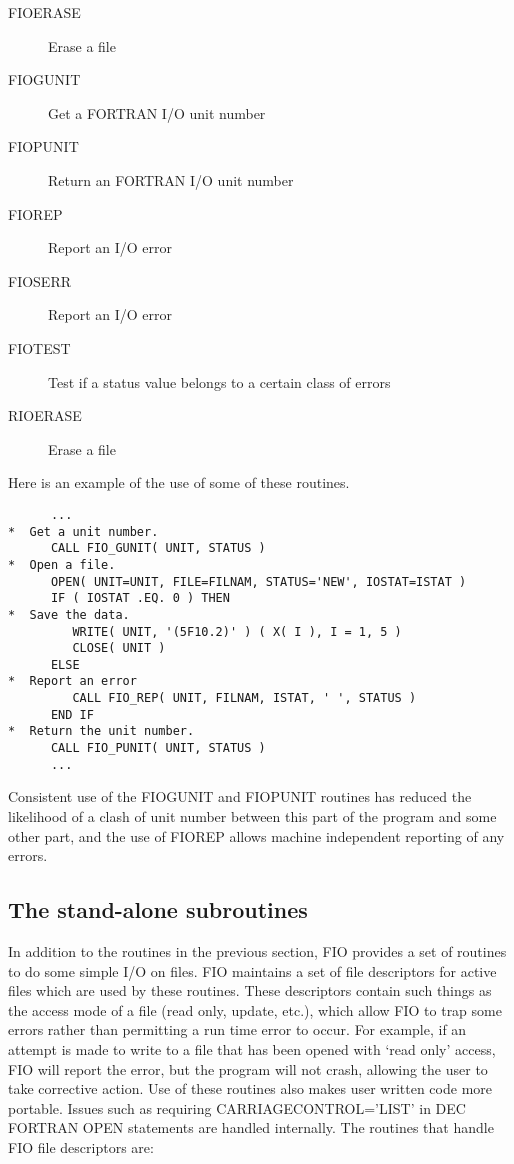 \documentclass[twoside,11pt]{article}
\renewcommand{\_}{\texttt{\symbol{95}}}
\begin{document}
\begin{description}
\item[FIO\_ERASE] Erase a file
\item[FIO\_GUNIT] Get a FORTRAN I/O unit number
\item[FIO\_PUNIT] Return an FORTRAN I/O unit number
\item[FIO\_REP]  Report an I/O error
\item[FIO\_SERR]  Report an I/O error
\item[FIO\_TEST]  Test if a status value belongs to a certain class of errors
\item[RIO\_ERASE] Erase a file
\end{description}

Here is an example of the use of some of these routines.

\begin{verbatim}
      ...
*  Get a unit number.
      CALL FIO_GUNIT( UNIT, STATUS )
*  Open a file.
      OPEN( UNIT=UNIT, FILE=FILNAM, STATUS='NEW', IOSTAT=ISTAT )
      IF ( IOSTAT .EQ. 0 ) THEN
*  Save the data.
         WRITE( UNIT, '(5F10.2)' ) ( X( I ), I = 1, 5 )
         CLOSE( UNIT )
      ELSE
*  Report an error
         CALL FIO_REP( UNIT, FILNAM, ISTAT, ' ', STATUS )
      END IF
*  Return the unit number.
      CALL FIO_PUNIT( UNIT, STATUS )
      ...
\end{verbatim}

Consistent use of the FIO\_GUNIT and FIO\_PUNIT routines has reduced the
likelihood of a clash of unit number between this part of the program and some
other part, and the use of FIO\_REP allows machine independent reporting of
any errors.

\subsection{The stand-alone subroutines}

In addition to the routines in the previous section, FIO provides a set of
routines to do some simple I/O on files. FIO maintains a set of file
descriptors for active files which are used by these routines. These
descriptors contain such things as the access mode of a file (read only,
update, etc.), which allow FIO to trap some errors rather than permitting a run
time error to occur. For example, if an attempt is made to write to a file that
has been opened with `read only' access, FIO will report the error, but the
program will not crash, allowing the user to take corrective action. Use of
these routines also makes user written code more portable. Issues such as
requiring CARRIAGECONTROL='LIST' in DEC FORTRAN OPEN statements are handled
internally. The routines that handle FIO file descriptors are:
\end{document}
